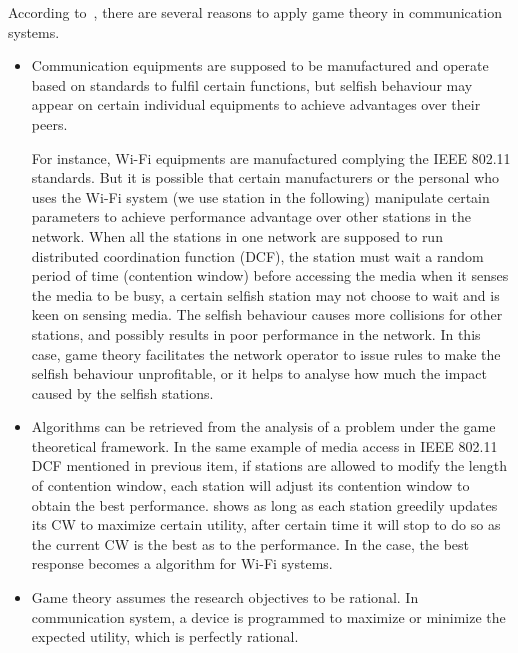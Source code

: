 According to~\cite{game_for_communication_01}, there are several reasons to apply game theory in communication systems.
\begin{itemize}
\item Communication equipments are supposed to be manufactured and operate based on standards to fulfil certain functions, but selfish behaviour may appear on certain individual equipments to achieve advantages over their peers.

For instance, Wi-Fi equipments are manufactured complying the IEEE 802.11 standards.
But it is possible that certain manufacturers or the personal who uses the Wi-Fi system (we use station in the following) manipulate certain parameters to achieve performance advantage over other stations in the network.
When all the stations in one network are supposed to run distributed coordination function (DCF), \ie the station must wait a random period of time (contention window) before accessing the media when it senses the media to be busy, a certain selfish station may not choose to wait and is keen on sensing media.
The selfish behaviour causes more collisions for other stations, and possibly results in poor performance in the network.
In this case, game theory facilitates the network operator to issue rules to make the selfish behaviour unprofitable, or it helps to analyse how much the impact caused by the selfish stations.

\item Algorithms can be retrieved from the analysis of a problem under the game theoretical framework.
In the same example of media access in IEEE 802.11 DCF mentioned in previous item, if stations are allowed to modify the length of contention window, each station will adjust its contention window to obtain the best performance.
\cite{contentiongame_07} shows as long as each station greedily updates its CW to maximize certain utility, after certain time it will stop to do so as the current CW is the best as to the performance.
In the case, the best response becomes a algorithm for Wi-Fi systems.


\item Game theory assumes the research objectives to be rational.
In communication system, a device is programmed to maximize or minimize the expected utility, which is perfectly rational.


\end{itemize}

